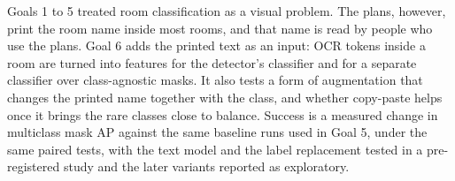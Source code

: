 Goals 1 to 5 treated room classification as a visual problem. The plans,
however, print the room name inside most rooms, and that name is read by
people who use the plans. Goal 6 adds the printed text as an input: OCR tokens
inside a room are turned into features for the detector's classifier and for a
separate classifier over class-agnostic masks. It also tests a form of
augmentation that changes the printed name together with the class, and
whether copy-paste helps once it brings the rare classes close to balance.
Success is a measured change in multiclass mask AP against the same baseline
runs used in Goal 5, under the same paired tests, with the text model and the
label replacement tested in a pre-registered study and the later variants
reported as exploratory.
